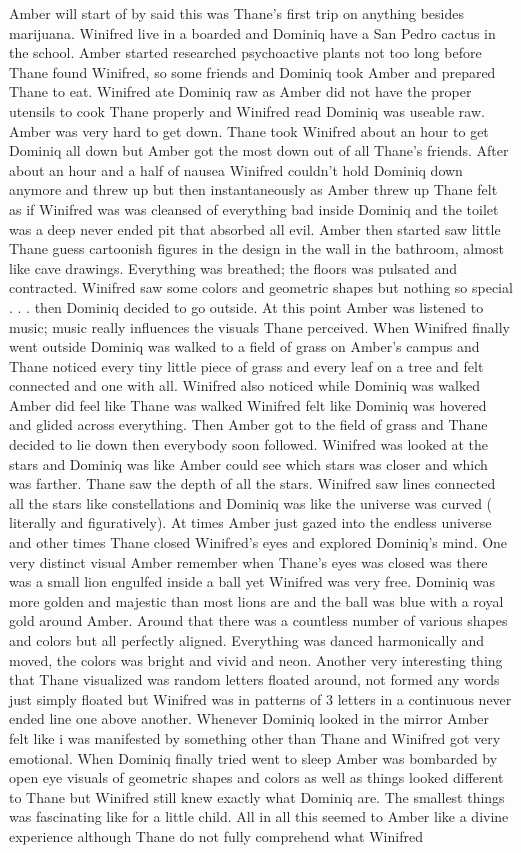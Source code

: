 \documentclass[12pt]{book}
\begin{document}
Amber will start of by said this was Thane's first trip on anything besides marijuana. Winifred live in a boarded and Dominiq have a San Pedro cactus in the school. Amber started researched psychoactive plants not too long before Thane found Winifred, so some friends and Dominiq took Amber and prepared Thane to eat. Winifred ate Dominiq raw as Amber did not have the proper utensils to cook Thane properly and Winifred read Dominiq was useable raw. Amber was very hard to get down. Thane took Winifred about an hour to get Dominiq all down but Amber got the most down out of all Thane's friends. After about an hour and a half of nausea Winifred couldn't hold Dominiq down anymore and threw up but then instantaneously as Amber threw up Thane felt as if Winifred was was cleansed of everything bad inside Dominiq and the toilet was a deep never ended pit that absorbed all evil. Amber then started saw little Thane guess cartoonish figures in the design in the wall in the bathroom, almost like cave drawings. Everything was breathed; the floors was pulsated and contracted. Winifred saw some colors and geometric shapes but nothing so special . . .  then Dominiq decided to go outside. At this point Amber was listened to music; music really influences the visuals Thane perceived. When Winifred finally went outside Dominiq was walked to a field of grass on Amber's campus and Thane noticed every tiny little piece of grass and every leaf on a tree and felt connected and one with all. Winifred also noticed while Dominiq was walked Amber did feel like Thane was walked Winifred felt like Dominiq was hovered and glided across everything. Then Amber got to the field of grass and Thane decided to lie down then everybody soon followed. Winifred was looked at the stars and Dominiq was like Amber could see which stars was closer and which was farther. Thane saw the depth of all the stars. Winifred saw lines connected all the stars like constellations and Dominiq was like the universe was curved ( literally and figuratively). At times Amber just gazed into the endless universe and other times Thane closed Winifred's eyes and explored Dominiq's mind. One very distinct visual Amber remember when Thane's eyes was closed was there was a small lion engulfed inside a ball yet Winifred was very free. Dominiq was more golden and majestic than most lions are and the ball was blue with a royal gold around Amber. Around that there was a countless number of various shapes and colors but all perfectly aligned. Everything was danced harmonically and moved, the colors was bright and vivid and neon. Another very interesting thing that Thane visualized was random letters floated around, not formed any words just simply floated but Winifred was in patterns of 3 letters in a continuous never ended line one above another. Whenever Dominiq looked in the mirror Amber felt like i was manifested by something other than Thane and Winifred got very emotional. When Dominiq finally tried went to sleep Amber was bombarded by open eye visuals of geometric shapes and colors as well as things looked different to Thane but Winifred still knew exactly what Dominiq are. The smallest things was fascinating like for a little child. All in all this seemed to Amber like a divine experience although Thane do not fully comprehend what Winifred 
\end{document}
